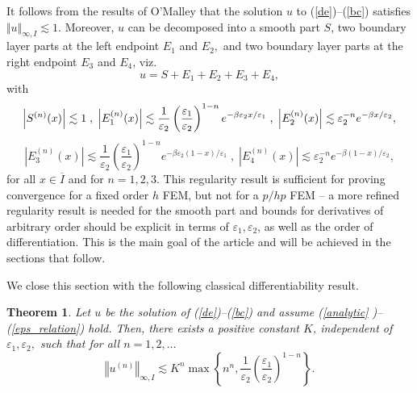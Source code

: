 \documentclass[12pt]{article}
\newtheorem{theorem}{Theorem}
\begin{document}
It follows from the results of O'Malley  \cite{omalley, omalley2} that the solution $u$ to 
(\ref{de})--(\ref{bc}) satisfies $\Vert u \Vert_{\infty, I} \lesssim 1$. Moreover, $u$ can
be decomposed into a smooth part $S$, two boundary layer parts at the left
endpoint $E_{1}$ and $E_{2},$ and two boundary layer parts at the right endpoint $E_{3}$ and $E_{4}$, viz.%
\begin{equation*}
u=S+E_{1}+E_{2}+E_{3}+E_{4},
\end{equation*}%
with%
\begin{equation*}
\left\vert S^{(n)}(x)\right\vert \lesssim 1\;,\;\left\vert
E_{1}^{(n)}(x)\right\vert \lesssim \frac{1}{\varepsilon _{2}}\left( \frac{%
\varepsilon _{1}}{\varepsilon _{2}}\right) ^{1-n}e^{-\beta \varepsilon
_{2}x/\varepsilon _{1}}\;,\;\left\vert E_{2}^{(n)}(x)\right\vert \lesssim
\varepsilon _{2}^{-n}e^{-\beta x/\varepsilon _{2}},
\end{equation*}%
\begin{equation*}
\left\vert E_{3}^{(n)}(x)\right\vert \lesssim \frac{1}{\varepsilon _{2}}%
\left( \frac{\varepsilon _{1}}{\varepsilon _{2}}\right)
^{1-n}e^{-\beta \varepsilon _{2}(1-x)/\varepsilon _{1}}\;,\;\left\vert
E_{4}^{(n)}(x)\right\vert \lesssim \varepsilon
_{2}^{-n}e^{-\beta (1-x)/\varepsilon _{2}},
\end{equation*}%
for all $x\in \overline{I}$ and for $n=1,2,3$. This regularity result is sufficient
for proving convergence for a fixed order $h$ FEM, but not for a $p/hp$ FEM
-- a more refined regularity result is needed for the smooth part and bounds for
derivatives of arbitrary order should be explicit in terms of $\varepsilon_1, \varepsilon_2$,
as well as the order of differentiation. This is the main
goal of the article and will be achieved in the sections that follow.

We close this section with the following classical differentiability result.

\begin{theorem}
Let $u$ be the solution of (\ref{de})--(\ref{bc}) and assume (\ref{analytic}%
)--(\ref{eps_relation}) hold. Then, there exists a positive constant $K$,
independent of $\varepsilon _{1},\varepsilon _{2},$ such that for
all $n=1,2,\ldots $%
\begin{equation*}
\left\Vert u^{(n)}\right\Vert _{\infty ,I}\lesssim K^{n}\max \left\{
n^{n}, \frac{1}{\varepsilon_2} \left( \frac{\varepsilon _{1}}{\varepsilon _{2}}\right)
^{1-n}\right\} .
\end{equation*}
\end{theorem}
\end{document}
